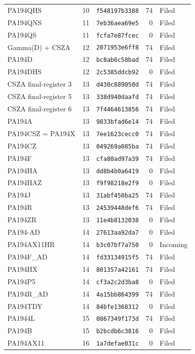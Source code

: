 \begin{longtable}{@{}>{\raggedright\arraybackslash}p{0.40\linewidth}r>{\raggedright\arraybackslash}p{0.22\linewidth}r>{\raggedright\arraybackslash}p{0.13\linewidth}@{}}
PA194QHS & 10 & \texttt{f548197b3388} & 74 & Filed\\
PA194QNS & 11 & \texttt{7eb36aea69e5} & 0 & Filed\\
PA194QS & 11 & \texttt{fcfa7e87fcec} & 0 & Filed\\
Gamma(D) + CSZA & 12 & \texttt{2071953e6ff8} & 74 & Filed\\
PA194D & 12 & \texttt{bc8ab6c58bad} & 74 & Filed\\
PA194DHS & 12 & \texttt{2c5385ddcb92} & 0 & Filed\\
CSZA final-register 3 & 13 & \texttt{d430c889050d} & 74 & Filed\\
CSZA final-register 5 & 13 & \texttt{338d940daafd} & 74 & Filed\\
CSZA final-register 6 & 13 & \texttt{7f4464613856} & 74 & Filed\\
PA194A & 13 & \texttt{9833bfad6e14} & 74 & Filed\\
PA194CSZ = PA194X & 13 & \texttt{7ee1623cecc0} & 74 & Filed\\
PA194CZ & 13 & \texttt{049269a085ba} & 74 & Filed\\
PA194F & 13 & \texttt{cfa80ad97a39} & 74 & Filed\\
PA194HA & 13 & \texttt{dd8b4b0a6419} & 0 & Filed\\
PA194HAZ & 13 & \texttt{f9f98218e2f9} & 0 & Filed\\
PA194J & 13 & \texttt{31abf450ba25} & 74 & Filed\\
PA194R & 13 & \texttt{24539448def6} & 74 & Filed\\
PA194ZR & 13 & \texttt{11e4b8132038} & 0 & Filed\\
PA194-AD & 14 & \texttt{27613aa92da7} & 0 & Filed\\
PA194AX11HR & 14 & \texttt{b3c07bf7a750} & 0 & Incoming\\
PA194F\_AD & 14 & \texttt{fd33134915f5} & 74 & Filed\\
PA194HX & 14 & \texttt{801357a42161} & 74 & Filed\\
PA194P5 & 14 & \texttt{cf3a2c2d3ba8} & 0 & Filed\\
PA194R\_AD & 14 & \texttt{4a15bb864399} & 74 & Filed\\
PA194TDY & 14 & \texttt{84bfe1368312} & 0 & Filed\\
PA1944L & 15 & \texttt{0867349f173d} & 74 & Filed\\
PA194B & 15 & \texttt{b2bcdb6c3816} & 0 & Filed\\
PA194AX11 & 16 & \texttt{1a7defae031c} & 0 & Filed\\

\end{longtable}
